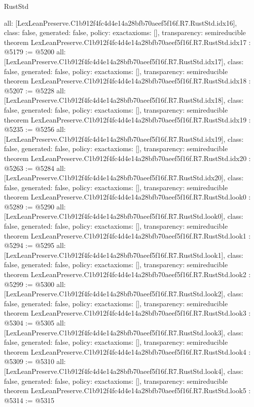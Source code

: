 \begin{lexlean}{RustStd}
\begin{coremodule}
{  all: [LexLeanPreserve.C1b912f4fc4d4e14a28bfb70aeef5f16f.R7.RustStd.idx16],
  class: false,
  generated: false,
  policy: exact{axioms: []},
  transparency: semireducible
}
theorem LexLeanPreserve.C1b912f4fc4d4e14a28bfb70aeef5f16f.R7.RustStd.idx17 : @5179 := @5200 {
  all: [LexLeanPreserve.C1b912f4fc4d4e14a28bfb70aeef5f16f.R7.RustStd.idx17],
  class: false,
  generated: false,
  policy: exact{axioms: []},
  transparency: semireducible
}
theorem LexLeanPreserve.C1b912f4fc4d4e14a28bfb70aeef5f16f.R7.RustStd.idx18 : @5207 := @5228 {
  all: [LexLeanPreserve.C1b912f4fc4d4e14a28bfb70aeef5f16f.R7.RustStd.idx18],
  class: false,
  generated: false,
  policy: exact{axioms: []},
  transparency: semireducible
}
theorem LexLeanPreserve.C1b912f4fc4d4e14a28bfb70aeef5f16f.R7.RustStd.idx19 : @5235 := @5256 {
  all: [LexLeanPreserve.C1b912f4fc4d4e14a28bfb70aeef5f16f.R7.RustStd.idx19],
  class: false,
  generated: false,
  policy: exact{axioms: []},
  transparency: semireducible
}
theorem LexLeanPreserve.C1b912f4fc4d4e14a28bfb70aeef5f16f.R7.RustStd.idx20 : @5263 := @5284 {
  all: [LexLeanPreserve.C1b912f4fc4d4e14a28bfb70aeef5f16f.R7.RustStd.idx20],
  class: false,
  generated: false,
  policy: exact{axioms: []},
  transparency: semireducible
}
theorem LexLeanPreserve.C1b912f4fc4d4e14a28bfb70aeef5f16f.R7.RustStd.look0 : @5289 := @5290 {
  all: [LexLeanPreserve.C1b912f4fc4d4e14a28bfb70aeef5f16f.R7.RustStd.look0],
  class: false,
  generated: false,
  policy: exact{axioms: []},
  transparency: semireducible
}
theorem LexLeanPreserve.C1b912f4fc4d4e14a28bfb70aeef5f16f.R7.RustStd.look1 : @5294 := @5295 {
  all: [LexLeanPreserve.C1b912f4fc4d4e14a28bfb70aeef5f16f.R7.RustStd.look1],
  class: false,
  generated: false,
  policy: exact{axioms: []},
  transparency: semireducible
}
theorem LexLeanPreserve.C1b912f4fc4d4e14a28bfb70aeef5f16f.R7.RustStd.look2 : @5299 := @5300 {
  all: [LexLeanPreserve.C1b912f4fc4d4e14a28bfb70aeef5f16f.R7.RustStd.look2],
  class: false,
  generated: false,
  policy: exact{axioms: []},
  transparency: semireducible
}
theorem LexLeanPreserve.C1b912f4fc4d4e14a28bfb70aeef5f16f.R7.RustStd.look3 : @5304 := @5305 {
  all: [LexLeanPreserve.C1b912f4fc4d4e14a28bfb70aeef5f16f.R7.RustStd.look3],
  class: false,
  generated: false,
  policy: exact{axioms: []},
  transparency: semireducible
}
theorem LexLeanPreserve.C1b912f4fc4d4e14a28bfb70aeef5f16f.R7.RustStd.look4 : @5309 := @5310 {
  all: [LexLeanPreserve.C1b912f4fc4d4e14a28bfb70aeef5f16f.R7.RustStd.look4],
  class: false,
  generated: false,
  policy: exact{axioms: []},
  transparency: semireducible
}
theorem LexLeanPreserve.C1b912f4fc4d4e14a28bfb70aeef5f16f.R7.RustStd.look5 : @5314 := @5315 {
}
\end{coremodule}
\end{lexlean}
